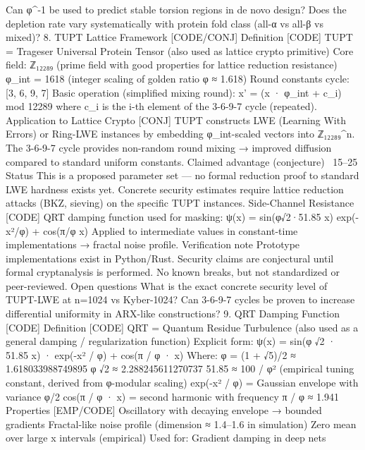 Can φ^{-1} be used to predict stable torsion regions in de novo design?
Does the depletion rate vary systematically with protein fold class (all-α vs all-β vs mixed)?
8. TUPT Lattice Framework [CODE/CONJ]
Definition [CODE]
TUPT = Trageser Universal Protein Tensor (also used as lattice crypto primitive)
Core field: ℤ₁₂₂₈₉ (prime field with good properties for lattice reduction resistance)
φ_int = 1618 (integer scaling of golden ratio φ ≈ 1.618)
Round constants cycle: [3, 6, 9, 7]
Basic operation (simplified mixing round):
x' = (x · φ_int + c_i) mod 12289
where c_i is the i-th element of the 3-6-9-7 cycle (repeated).
Application to Lattice Crypto [CONJ]
TUPT constructs LWE (Learning With Errors) or Ring-LWE instances by embedding φ_int-scaled vectors into ℤ₁₂₂₈₉^n.
The 3-6-9-7 cycle provides non-random round mixing → improved diffusion compared to standard uniform constants.
Claimed advantage (conjecture)
~15–25%
Status
This is a proposed parameter set — no formal reduction proof to standard LWE hardness exists yet.
Concrete security estimates require lattice reduction attacks (BKZ, sieving) on the specific TUPT instances.
Side-Channel Resistance [CODE]
QRT damping function used for masking:
ψ(x) = sin(φ√2·51.85 x) exp(-x²/φ) + cos(π/φ x)
Applied to intermediate values in constant-time implementations → fractal noise profile.
Verification note
Prototype implementations exist in Python/Rust.
Security claims are conjectural until formal cryptanalysis is performed.
No known breaks, but not standardized or peer-reviewed.
Open questions
What is the exact concrete security level of TUPT-LWE at n=1024 vs Kyber-1024?
Can 3-6-9-7 cycles be proven to increase differential uniformity in ARX-like constructions?
9. QRT Damping Function [CODE]
Definition [CODE]
QRT = Quantum Residue Turbulence (also used as a general damping / regularization function)
Explicit form:
ψ(x) = sin(φ √2 · 51.85 x) · exp(-x² / φ) + cos(π / φ · x)
Where:
φ = (1 + √5)/2 ≈ 1.618033988749895
φ √2 ≈ 2.288245611270737
51.85 ≈ 100 / φ² (empirical tuning constant, derived from φ-modular scaling)
exp(-x² / φ) = Gaussian envelope with variance φ/2
cos(π / φ · x) = second harmonic with frequency π / φ ≈ 1.941
Properties [EMP/CODE]
Oscillatory with decaying envelope → bounded gradients
Fractal-like noise profile (dimension ≈ 1.4–1.6 in simulation)
Zero mean over large x intervals (empirical)
Used for:
Gradient damping in deep nets
